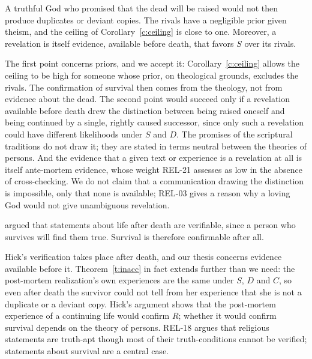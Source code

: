 \documentclass{situationist-preprint}
\begin{document}
\begin{objection}\label{o:reveal}
A truthful God who promised that the dead will be raised would not then produce duplicates or deviant copies. The rivals have a negligible prior given theism, and the ceiling of Corollary~\ref{c:ceiling} is close to one. Moreover, a revelation is itself evidence, available before death, that favors $S$ over its rivals.
\end{objection}

\begin{reply}
The first point concerns priors, and we accept it: Corollary~\ref{c:ceiling} allows the ceiling to be high for someone whose prior, on theological grounds, excludes the rivals. The confirmation of survival then comes from the theology, not from evidence about the dead. The second point would succeed only if a revelation available before death drew the distinction between being raised oneself and being continued by a single, rightly caused successor, since only such a revelation could have different likelihoods under $S$ and $D$. The promises of the scriptural traditions do not draw it; they are stated in terms neutral between the theories of persons. And the evidence that a given text or experience is a revelation at all is itself ante-mortem evidence, whose weight REL-21 assesses as low in the absence of cross-checking. We do not claim that a communication drawing the distinction is impossible, only that none is available; REL-03 gives a reason why a loving God would not give unambiguous revelation.
\end{reply}

\begin{objection}\label{o:hick}
\citet{Hick1960} argued that statements about life after death are verifiable, since a person who survives will find them true. Survival is therefore confirmable after all.
\end{objection}

\begin{reply}
Hick's verification takes place after death, and our thesis concerns evidence available before it. Theorem~\ref{t:inacc} in fact extends further than we need: the post-mortem realization's own experiences are the same under $S$, $D$ and $C$, so even after death the survivor could not tell from her experience that she is not a duplicate or a deviant copy. Hick's argument shows that the post-mortem experience of a continuing life would confirm $R$; whether it would confirm survival depends on the theory of persons. REL-18 argues that religious statements are truth-apt though most of their truth-conditions cannot be verified; statements about survival are a central case.
\end{reply}
\end{document}
